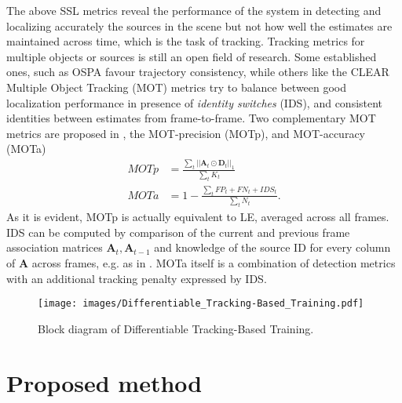 \documentclass[conference]{IEEEtran}
\def\D {\mathbf{D}}
\def\A {\mathbf{A}}
\begin{document}
The above SSL metrics reveal the performance of the system in detecting and localizing accurately the sources in the scene but not how well the estimates are maintained across time, which is the task of tracking. Tracking metrics for multiple objects or sources is still an open field of research. Some established ones, such as OSPA \cite{schuhmacher2008consistent} favour trajectory consistency, while others like the CLEAR Multiple Object Tracking (MOT) metrics \cite{bernardin2008evaluating} try to balance between good localization performance in presence of \emph{identity switches} (IDS), and consistent identities between estimates from frame-to-frame. Two complementary MOT metrics are proposed in \cite{bernardin2008evaluating}, the MOT-precision (MOTp), and MOT-accuracy (MOTa)
\begin{align}
    MOTp &= \frac{\sum_t || \A_t \odot \D_t||_1}{\sum_t K_t} \\
    MOTa &= 1 - \frac{\sum_t FP_t+FN_t+IDS_t}{\sum_t N_t}.
\end{align}
As it is evident, MOTp is actually equivalent to LE, averaged across all frames. IDS can be computed by comparison of the current and previous frame association matrices $\A_t, \A_{t-1}$ and knowledge of the source ID for every column of $\A$ across frames, e.g. as in \cite{xu2020train}. MOTa itself is a combination of detection metrics with an additional tracking penalty expressed by IDS.


\begin{figure}[!tp]
\centerline{\texttt{[image: images/Differentiable\_Tracking-Based\_Training.pdf]}}
\vspace{-10pt}
\caption{Block diagram of Differentiable Tracking-Based Training.}
\label{fig:doanet}
\vspace{-10pt}
\end{figure}



\section{Proposed method}
\end{document}
